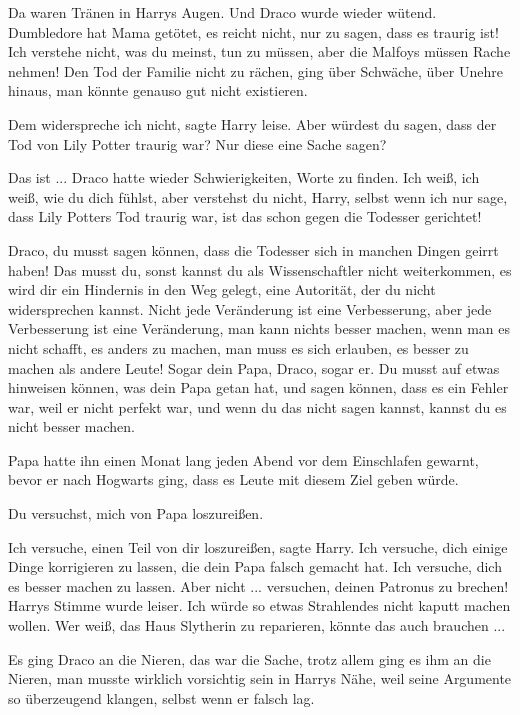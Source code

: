 Da waren Tränen in Harrys Augen. Und Draco wurde wieder wütend. \glqq{}Dumbledore
hat Mama getötet, es reicht nicht, nur zu sagen, dass es traurig ist! Ich
verstehe nicht, was du meinst, tun zu müssen, aber die Malfoys müssen Rache
nehmen!\grqq{} Den Tod der Familie nicht zu rächen, ging über Schwäche, über
Unehre hinaus, man könnte genauso gut nicht existieren.

\glqq{}Dem widerspreche ich nicht\grqq{}, sagte Harry leise. \glqq{}Aber würdest
du sagen, dass der Tod von Lily Potter traurig war? Nur diese eine Sache
sagen?\grqq{}

\glqq{}Das ist ...\grqq{} Draco hatte wieder Schwierigkeiten, Worte zu finden.
\glqq{}Ich weiß, ich weiß, wie du dich fühlst, aber verstehst du nicht, Harry,
selbst wenn ich nur sage, dass Lily Potters Tod traurig war, ist das schon gegen
die Todesser gerichtet!\grqq{}

\glqq{}Draco, du musst sagen können, dass die Todesser sich in manchen Dingen
geirrt haben! Das musst du, sonst kannst du als Wissenschaftler nicht
weiterkommen, es wird dir ein Hindernis in den Weg gelegt, eine Autorität, der
du nicht widersprechen kannst. Nicht jede Veränderung ist eine Verbesserung,
aber jede Verbesserung ist eine Veränderung, man kann nichts besser machen, wenn
man es nicht schafft, es anders zu machen, man muss es sich erlauben, es besser
zu machen als andere Leute! Sogar dein Papa, Draco, sogar er. Du musst auf
etwas hinweisen können, was dein Papa getan hat, und sagen können, dass es ein
Fehler war, weil er nicht perfekt war, und wenn du das nicht sagen kannst,
kannst du es nicht besser machen.\grqq{}

Papa hatte ihn einen Monat lang jeden Abend vor dem Einschlafen gewarnt, bevor
er nach Hogwarts ging, dass es Leute mit diesem Ziel geben würde.

\glqq{}Du versuchst, mich von Papa loszureißen.\grqq{}

\glqq{}Ich versuche, einen Teil von dir loszureißen\grqq{}, sagte Harry. \glqq{}
Ich versuche, dich einige Dinge korrigieren zu lassen, die dein Papa falsch
gemacht hat. Ich versuche, dich es besser machen zu lassen. Aber nicht ...
versuchen, deinen Patronus zu brechen!\grqq{} Harrys Stimme wurde leiser. \glqq{}
Ich würde so etwas Strahlendes nicht kaputt machen wollen. Wer weiß, das Haus
Slytherin zu reparieren, könnte das auch brauchen ...\grqq{}

Es ging Draco an die Nieren, das war die Sache, trotz allem ging es ihm an die
Nieren, man musste wirklich vorsichtig sein in Harrys Nähe, weil seine Argumente
so überzeugend klangen, selbst wenn er falsch lag.

